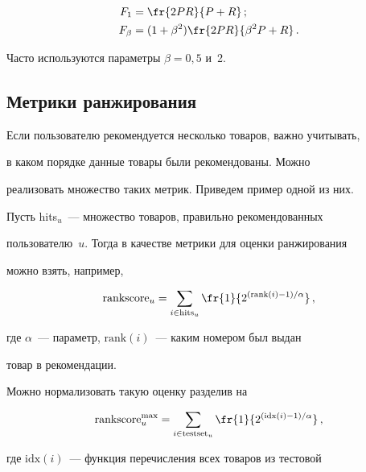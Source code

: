 \begin{align*}


F_1&=\fr{2  P  R}{P+R}\,;


\\


F_\beta&=(1+\beta^2)\fr{2  P  R}{\beta^2 P+R}\,.


\end{align*}





Часто используются параметры $\beta=0{,}5$ и~2.





\subsection{Метрики ранжирования}





Если пользователю рекомендуется несколько товаров, важно учитывать,


в каком порядке данные товары были рекомендованы. Можно


реализовать множество таких метрик. Приведем пример одной из них.





Пусть hits$_u$~--- множество товаров, правильно рекомендованных


пользователю~$u.$ Тогда в качестве метрики для оценки ранжирования


можно взять, например,


$$


\mathrm{rankscore}_u=\sum\limits_{i \in \mathrm{hits}_u} \fr{1}{2^{(\mathrm{rank}\left(i\right)-1)/\alpha}}\,,


$$


где $\alpha$~--- параметр, $\mathrm{rank}\left(i\right)$~--- каким номером был выдан


товар в рекомендации.





Можно нормализовать такую оценку разделив на


$$


\mathrm{rankscore}^{\max}_u=\sum\limits_{i \in \mathrm{testset}_u} \fr{1}{2^{(\mathrm{idx}\left(i\right)-1)/\alpha}}\,,


$$


где $\mathrm{idx}\left(i\right)$~--- функция перечисления всех товаров из тестовой


